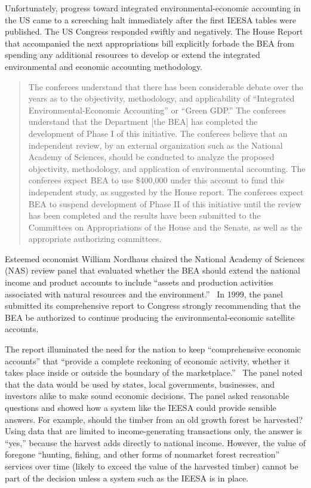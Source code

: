 Unfortunately, progress toward integrated environmental-economic accounting 
in the US came to a screeching halt immediately after the first IEESA tables were published. 
The US Congress responded swiftly and negatively. The House Report that 
accompanied the next appropriations bill explicitly forbade the BEA from spending  
any additional resources to develop or extend
the integrated environmental and economic accounting methodology. 

\begin{quote}
	The conferees understand that there has been considerable debate 
	over the years as to the objectivity, methodology, and applicability 
	of ``Integrated Environmental-Economic Accounting'' or ``Green GDP.''
	The conferees understand that the Department [the BEA]
	has completed the development of Phase I of this initiative. 
	The conferees believe that an independent review, 
	by an external organization such as the National Academy of Sciences, 
	should be conducted to analyze 
	the proposed objectivity, methodology, and application of environmental accounting. 
	The conferees expect BEA to use \$400,000 under this account 
	to fund this independent study, as suggested by the House report. 
	The conferees expect BEA to suspend development 
	of Phase II of this initiative 
	until the review has been completed and the results have been submitted 
	to the Committees on Appropriations of the House and the Senate, 
	as well as the appropriate authorizing committees.\cite{HR103708}
\end{quote}

Esteemed economist William Nordhaus chaired the 
National Academy of Sciences (NAS) review panel
that evaluated whether the BEA should extend 
the national income and product accounts to include 
``assets and production activities associated 
with natural resources and the environment.''~\cite[p.~2]{Nordhaus1999a} 
In 1999, the panel submitted its comprehensive report 
to Congress strongly recommending that the BEA be authorized 
to continue producing the environmental-economic satellite accounts.\cite{Nordhaus1999a}

The report illuminated the need for the nation 
to keep ``comprehensive economic accounts'' that 
``provide a complete reckoning of economic activity, 
whether it takes place inside or outside 
the boundary of the marketplace.''~\cite[p.~29]{Nordhaus1999a}
The panel noted that the data would be used 
by states, local governments, businesses, and investors alike 
to make sound economic decisions. 
The panel asked reasonable questions and showed how a system like the IEESA
could provide sensible answers.
For example, should the timber from an old growth forest be harvested? 
Using data that are limited to income-generating transactions only, 
the answer is ``yes,''
because the harvest adds directly to national income. 
However, the value of foregone ``hunting, fishing, 
and other forms of nonmarket forest recreation'' 
services over time (likely to exceed the value of the harvested timber)
cannot be part of the decision unless 
a system such as the IEESA is in place.\cite[p.~30]{Nordhaus1999a}

